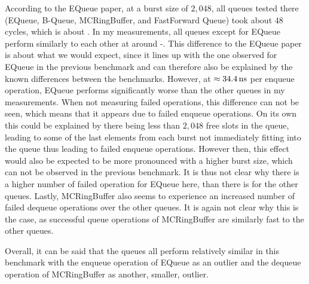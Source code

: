 According to the EQueue paper, at a burst size of $2,048$, all queues tested there (EQueue, B-Queue,
MCRingBuffer, and FastForward Queue) took about $48$ cycles, which is about .
In my measurements, all queues except for EQueue perform similarly to each other at around -.
This difference to the EQueue paper is about what we would expect, since it lines up with the one observed
for EQueue in the previous benchmark and can therefore also be explained by the known differences between the
benchmarks.
However, at $\approx \SI{34.4}{\nano\second}$ per enqueue operation, EQueue performs significantly worse than the other
queues in my measurements.
When not measuring failed operations, this difference can not be seen, which means that it appears due to
failed enqueue operations.
On its own this could be explained by there being less than $2,048$ free slots in the queue, leading to some
of the last elements from each burst not immediately fitting into the queue thus leading to failed enqueue operations.
However then, this effect would also be expected to be more pronounced with a higher burst size, which can
not be observed in the previous benchmark.
It is thus not clear why there is a higher number of failed operation for EQueue here, than there is for the
other queues.
Lastly, MCRingBuffer also seems to experience an increased number of failed dequeue operations over the other queues.
It is again not clear why this is the case, as successful queue operations of MCRingBuffer are similarly fast
to the other queues.

Overall, it can be said that the queues all perform relatively similar in this benchmark with the enqueue
operation of EQueue as an outlier and the dequeue operation of MCRingBuffer as another, smaller, outlier.

